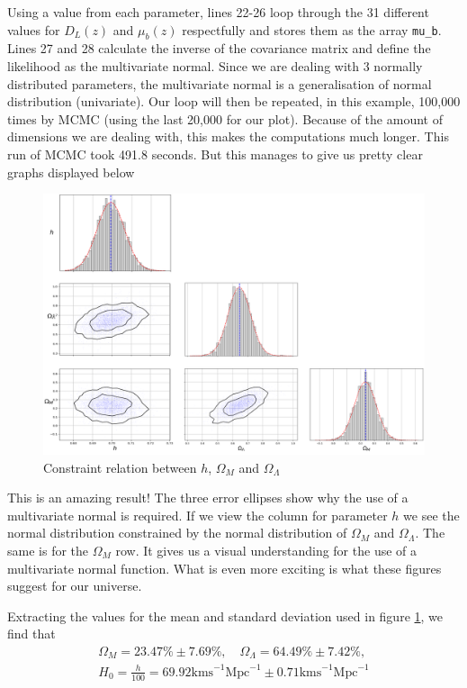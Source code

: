 \documentclass[12pt,twoside]{report}   %
\begin{document}
Using a value from each parameter, lines 22-26 loop through the 31 different values for $D_L(z)$ and $\mu_b(z)$ respectfully and stores them as the array \texttt{mu\_b}. Lines 27 and 28 calculate the inverse of the covariance matrix and define the likelihood as the multivariate normal. Since we are dealing with 3 normally distributed parameters, the multivariate normal is a generalisation of normal distribution (univariate). Our loop will then be repeated, in this example, 100,000 times by MCMC (using the last 20,000 for our plot). Because of the amount of dimensions we are dealing with, this makes the computations much longer. This run of MCMC took 491.8 seconds. But this manages to give us pretty clear graphs displayed below
\begin{figure}[H]
\centering
\includegraphics[width = 6in]{triangle.png}
\caption{Constraint relation between $h$, $\Omega_M$ and $\Omega_\Lambda$}
\label{figConstraint}
\end{figure}

This is an amazing result! The three error ellipses show why the use of a multivariate normal is required. If we view the column for parameter $h$ we see the normal distribution constrained by the normal distribution of $\Omega_M$ and $\Omega_\Lambda$. The same is for the $\Omega_M$ row. It gives us a visual understanding for the use of a multivariate normal function. What is even more exciting is what these figures suggest for our universe. 
\pagebreak

Extracting the values for the mean and standard deviation used in figure \ref{figConstraint}, we find that
\begin{align*}
\Omega_M = 23.47\% \pm 7.69\%,\quad\Omega_\Lambda = 64.49\% \pm 7.42\%,\\
H_0 = \frac{h}{100} = 69.92\mathrm{kms}^{-1}\mathrm{Mpc}^{-1} \pm 0.71\mathrm{kms}^{-1}\mathrm{Mpc}^{-1}
\end{align*}
\end{document}
